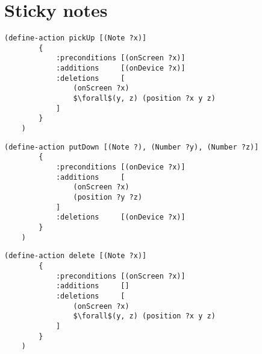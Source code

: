 \section{Sticky notes}

\begin{lstlisting}[caption=pickUp,mathescape=true]
    (define-action pickUp [(Note ?x)]
        {
            :preconditions [(onScreen ?x)]
            :additions     [(onDevice ?x)]
            :deletions     [
                (onScreen ?x)
                $\forall$(y, z) (position ?x y z)
            ]
        }
    )
\end{lstlisting}

\begin{lstlisting}[caption=putDown]
    (define-action putDown [(Note ?), (Number ?y), (Number ?z)]
        {
            :preconditions [(onDevice ?x)]
            :additions     [
                (onScreen ?x)
                (position ?y ?z)
            ]
            :deletions     [(onDevice ?x)]
        }
    )
\end{lstlisting}

\begin{lstlisting}[caption=delete,mathescape=true]
    (define-action delete [(Note ?x)]
        {
            :preconditions [(onScreen ?x)]
            :additions     []
            :deletions     [
                (onScreen ?x)
                $\forall$(y, z) (position ?x y z)
            ]
        }
    )
\end{lstlisting}
